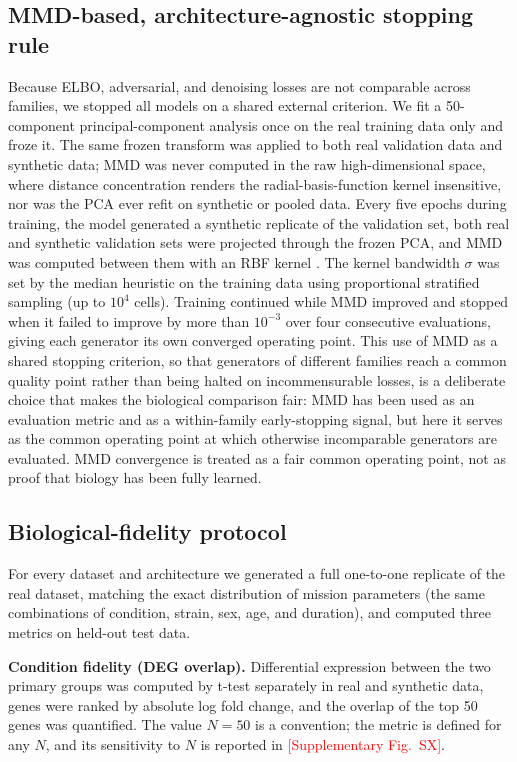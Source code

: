 \documentclass[11pt]{article}
\newcommand{\res}[1]{\textcolor{red}{[#1]}}
\begin{document}
\subsection{MMD-based, architecture-agnostic stopping rule}
Because ELBO, adversarial, and denoising losses are not comparable across families, we stopped all models on a shared external criterion. We fit a 50-component principal-component analysis once on the real training data only and froze it. The same frozen transform was applied to both real validation data and synthetic data; MMD was never computed in the raw high-dimensional space, where distance concentration renders the radial-basis-function kernel insensitive, nor was the PCA ever refit on synthetic or pooled data. Every five epochs during training, the model generated a synthetic replicate of the validation set, both real and synthetic validation sets were projected through the frozen PCA, and MMD was computed between them with an RBF kernel \cite{gretton,sutherland}. The kernel bandwidth $\sigma$ was set by the median heuristic on the training data using proportional stratified sampling (up to $10^4$ cells). Training continued while MMD improved and stopped when it failed to improve by more than $10^{-3}$ over four consecutive evaluations, giving each generator its own converged operating point. This use of MMD as a shared stopping criterion, so that generators of different families reach a common quality point rather than being halted on incommensurable losses, is a deliberate choice that makes the biological comparison fair: MMD has been used as an evaluation metric \cite{gretton,sutherland} and as a within-family early-stopping signal, but here it serves as the common operating point at which otherwise incomparable generators are evaluated. MMD convergence is treated as a fair common operating point, not as proof that biology has been fully learned.

\subsection{Biological-fidelity protocol}
For every dataset and architecture we generated a full one-to-one replicate of the real dataset, matching the exact distribution of mission parameters (the same combinations of condition, strain, sex, age, and duration), and computed three metrics on held-out test data.

\noindent\textbf{Condition fidelity (DEG overlap).} Differential expression between the two primary groups was computed by t-test separately in real and synthetic data, genes were ranked by absolute log fold change, and the overlap of the top 50 genes was quantified. The value $N=50$ is a convention; the metric is defined for any $N$, and its sensitivity to $N$ is reported in \res{Supplementary Fig.\ SX}.
\end{document}
